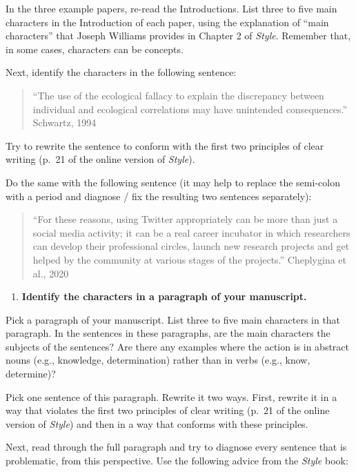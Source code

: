 \documentclass[]{tufte-book}
\providecommand{\tightlist}{%
  \setlength{\itemsep}{0pt}\setlength{\parskip}{0pt}}
\begin{document}
In the three example papers, re-read the Introductions. List three to five main
characters in the Introduction of each paper, using the explanation of ``main characters''
that Joseph Williams provides in Chapter 2 of \emph{Style}. Remember that, in some cases,
characters can be concepts.

Next, identify the characters in the following sentence:

\begin{quote}
``The use of the ecological fallacy to explain the discrepancy between
individual and ecological correlations may have unintended consequences.''
Schwartz, 1994
\end{quote}

Try to rewrite the sentence to conform with the first two principles of clear
writing (p.~21 of the online version of \emph{Style}).

Do the same with the following sentence (it may help to replace the semi-colon
with a period and diagnose / fix the resulting two sentences separately):

\begin{quote}
``For these reasons, using Twitter appropriately can be more than just a social
media activity; it can be a real career incubator in which researchers can
develop their professional circles, launch new research projects and get helped
by the community at various stages of the projects.'' Cheplygina et al., 2020
\end{quote}

\begin{enumerate}
\def\labelenumi{\arabic{enumi}.}
\setcounter{enumi}{4}
\tightlist
\item
  \textbf{Identify the characters in a paragraph of your manuscript.}
\end{enumerate}

Pick a paragraph of your manuscript. List three to five main characters in that paragraph.
In the sentences in these paragraphs, are the main characters the subjects of the
sentences? Are there any examples where the action is in abstract nouns (e.g., knowledge,
determination) rather than in verbs (e.g., know, determine)?

Pick one sentence of this paragraph. Rewrite it two ways. First, rewrite it in a way that
violates the first two principles of clear writing (p.~21 of the online version of \emph{Style})
and then in a way that conforms with these principles.

Next, read through the full paragraph and try to diagnose every sentence that is
problematic, from this perspective. Use the following advice from the \emph{Style}
book:
\end{document}
